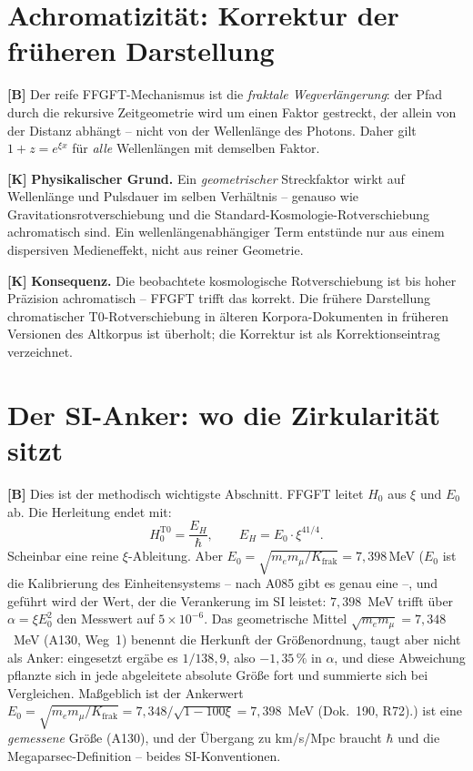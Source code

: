\section{Achromatizität: Korrektur der früheren Darstellung}

\textbf{[B]} Der reife FFGFT-Mechanismus ist die \emph{fraktale Wegverlängerung}:
der Pfad durch die rekursive Zeitgeometrie wird um einen Faktor gestreckt, der
allein von der Distanz abhängt -- nicht von der Wellenlänge des Photons. Daher
gilt $1+z=e^{\xi x}$ für \emph{alle} Wellenlängen mit demselben Faktor.

\textbf{[K]} \textbf{Physikalischer Grund.} Ein \emph{geometrischer} Streckfaktor
wirkt auf Wellenlänge und Pulsdauer im selben Verhältnis -- genauso wie
Gravitationsrotverschiebung und die Standard-Kosmologie-Rotverschiebung
achromatisch sind. Ein wellenlängenabhängiger Term entstünde nur aus einem
dispersiven Medieneffekt, nicht aus reiner Geometrie.

\textbf{[K]} \textbf{Konsequenz.} Die beobachtete kosmologische Rotverschiebung
ist bis hoher Präzision achromatisch -- FFGFT trifft das korrekt. Die frühere
Darstellung chromatischer T0-Rotverschiebung in älteren Korpora-Dokumenten
in früheren Versionen des Altkorpus ist überholt; die
Korrektur ist als Korrektionseintrag verzeichnet.

\section{Der SI-Anker: wo die Zirkularität sitzt}

\textbf{[B]} Dies ist der methodisch wichtigste Abschnitt. FFGFT leitet $H_0$
aus $\xi$ und $E_0$ ab. Die Herleitung endet mit:
\[
  H_0^\text{T0} = \frac{E_H}{\hbar},
  \qquad E_H = E_0\cdot\xi^{41/4}.
\]
Scheinbar eine reine $\xi$-Ableitung. Aber $E_0=\sqrt{m_em_\mu/K_\text{frak}}=7{,}398\,$MeV ($E_0$ ist die Kalibrierung des Einheitensystems -- nach A085 gibt es genau eine --, und geführt wird der Wert, der die Verankerung im SI leistet: $7{,}398$~MeV trifft über $\alpha = \xi E_0^2$ den Messwert auf $5\times10^{-6}$. Das geometrische Mittel $\sqrt{m_em_\mu} = 7{,}348$~MeV (A130, Weg~1) benennt die Herkunft der Größenordnung, taugt aber nicht als Anker: eingesetzt ergäbe es $1/138{,}9$, also $-1{,}35\,\%$ in $\alpha$, und diese Abweichung pflanzte sich in jede abgeleitete absolute Größe fort und summierte sich bei Vergleichen. Maßgeblich ist der Ankerwert $E_0 = \sqrt{m_em_\mu/K_\text{frak}} = 7{,}348/\sqrt{1-100\xi} = 7{,}398$~MeV (Dok.~190, R72).)
ist eine \emph{gemessene} Größe (A130), und der Übergang zu km/s/Mpc braucht
$\hbar$ und die Megaparsec-Definition -- beides SI-Konventionen.

